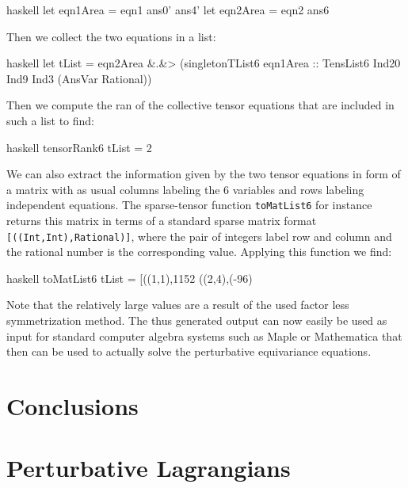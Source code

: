 \documentclass[a4paper,12pt, DIV=14, BCOR=5mm, twoside, headsepline]{scrbook}
\begin{document}
\begin{center}
\begin{cminted}{haskell}
let eqn1Area = eqn1 ans0' ans4' 
let eqn2Area = eqn2 ans6  
\end{cminted}
\end{center}
Then we collect the two equations in a list:
\begin{center}
\begin{cminted}{haskell}
let tList = eqn2Area &.&> (singletonTList6 eqn1Area ::
            TensList6 Ind20 Ind9 Ind3 (AnsVar Rational)) 
\end{cminted}
\end{center}
Then we compute the ran of the collective tensor equations that are included in such a list to find:
\begin{center}
\begin{cminted}{haskell}
tensorRank6 tList = 2 
\end{cminted}
\end{center}
We can also extract the information given by the two tensor equations in form of a matrix with as usual columns labeling the 6 variables and rows labeling independent equations. The sparse-tensor function \texttt{toMatList6} for instance returns this matrix in terms of a standard sparse matrix format \texttt{[((Int,Int),Rational)]}, where the pair of integers label row and column and the rational number is the corresponding value. Applying this function we find:
\begin{center}
\begin{cminted}{haskell}
toMatList6 tList = [((1,1),1152 %
                   ((2,4),(-96) %
\end{cminted}
\end{center}
Note that the relatively large values are a result of the used factor less symmetrization method. The thus generated output can now easily be used as input for standard computer algebra systems such as Maple or Mathematica that then can be used to actually solve the perturbative equivariance equations.  

\chapter{Conclusions}

\appendix

\chapter{Perturbative Lagrangians}
\end{document}
